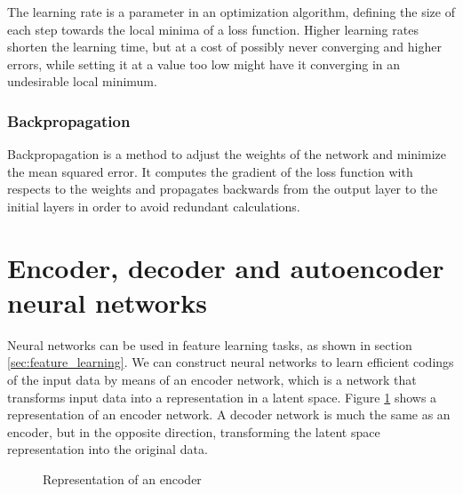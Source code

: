 The learning rate is a parameter in an optimization algorithm, defining the size of each step towards the local minima of a loss function. Higher learning rates shorten the learning time, but at a cost of possibly never converging and higher errors, while setting it at a value too low might have it converging in an undesirable local minimum.

\subsubsection{Backpropagation}

Backpropagation is a method to adjust the weights of the network and minimize the mean squared error. It computes the gradient of the loss function with respects to the weights and propagates backwards from the output layer to the initial layers in order to avoid redundant calculations.

\section{Encoder, decoder and autoencoder neural networks}

Neural networks can be used in feature learning tasks, as shown in section \ref{sec:feature_learning}. We can construct neural networks to learn efficient codings of the input data by means of an encoder network, which is a network that transforms input data into a representation in a latent space. Figure \ref{fig:encoder} shows a representation of an encoder network. A decoder network is much the same as an encoder, but in the opposite direction, transforming the latent space representation into the original data.

\begin{figure}[!ht]
	\centering
	\caption{Representation of an encoder} \label{fig:encoder}
\end{figure}

